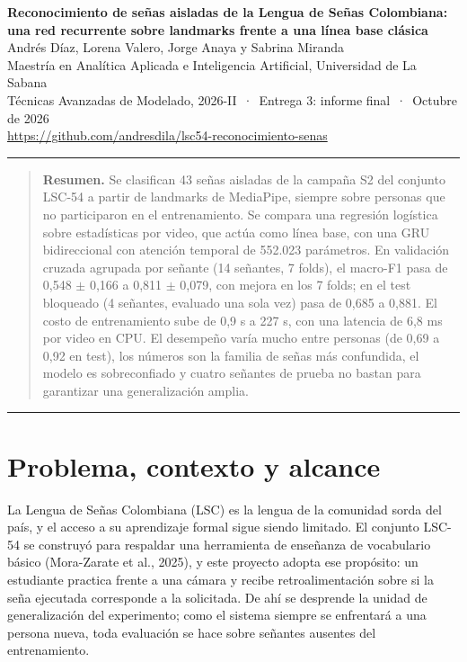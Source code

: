 \documentclass[11pt,a4paper]{article}
\begin{document}
\thispagestyle{plain}
\begin{center}
{\Large\bfseries Reconocimiento de señas aisladas de la Lengua de Señas Colombiana:\\[3pt] una red recurrente sobre landmarks frente a una línea base clásica}\\[8pt]
{\normalsize Andrés Díaz, Lorena Valero, Jorge Anaya y Sabrina Miranda}\\[3pt]
{\small Maestría en Analítica Aplicada e Inteligencia Artificial, Universidad de La Sabana}\\
{\small Técnicas Avanzadas de Modelado, 2026-II \,·\, Entrega 3: informe final \,·\, Octubre de 2026}\\[2pt]
{\small\url{https://github.com/andresdila/lsc54-reconocimiento-senas}}
\end{center}
\vspace{2pt}
\noindent\rule{\textwidth}{0.4pt}

\begin{quote}\small
\noindent\textbf{Resumen.} Se clasifican 43 señas aisladas de la campaña S2 del conjunto LSC-54 a partir de landmarks de MediaPipe, siempre sobre personas que no participaron en el entrenamiento. Se compara una regresión logística sobre estadísticas por video, que actúa como línea base, con una GRU bidireccional con atención temporal de 552.023 parámetros. En validación cruzada agrupada por señante (14 señantes, 7 folds), el macro-F1 pasa de 0,548 $\pm$ 0,166 a 0,811 $\pm$ 0,079, con mejora en los 7 folds; en el test bloqueado (4 señantes, evaluado una sola vez) pasa de 0,685 a 0,881. El costo de entrenamiento sube de 0,9 s a 227 s, con una latencia de 6,8 ms por video en CPU. El desempeño varía mucho entre personas (de 0,69 a 0,92 en test), los números son la familia de señas más confundida, el modelo es sobreconfiado y cuatro señantes de prueba no bastan para garantizar una generalización amplia.
\end{quote}
\vspace{-4pt}
\noindent\rule{\textwidth}{0.4pt}

\section{Problema, contexto y alcance}

La Lengua de Señas Colombiana (LSC) es la lengua de la comunidad sorda del país, y el acceso a su aprendizaje formal sigue siendo limitado. El conjunto LSC-54 se construyó para respaldar una herramienta de enseñanza de vocabulario básico (Mora-Zarate et al., 2025), y este proyecto adopta ese propósito: un estudiante practica frente a una cámara y recibe retroalimentación sobre si la seña ejecutada corresponde a la solicitada. De ahí se desprende la unidad de generalización del experimento; como el sistema siempre se enfrentará a una persona nueva, toda evaluación se hace sobre señantes ausentes del entrenamiento.
\end{document}
